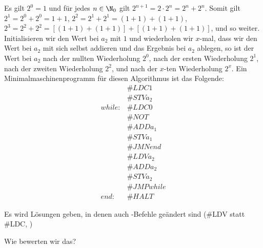 \documentclass[12pt]{article}
\newcommand{\lbl}[1]{\mathit{#1}}
\begin{document}
\begin{loesung}
  Es gilt $2^0 = 1$ und für jedes $n \in \N_0$ gilt $2^{n + 1} = 2 \cdot 2^n = 2^n + 2^n$. Somit gilt $2^1 = 2^0 + 2^0 = 1 + 1$, $2^2 = 2^1 + 2^1 = (1 + 1) + (1 + 1)$, $2^3 = 2^2 + 2^2 = [(1 + 1) + (1 + 1)] + [(1 + 1) + (1 + 1)]$, und so weiter. Initialisieren wir den Wert bei $a_2$ mit $1$ und wiederholen wir $x$-mal, dass wir den Wert bei $a_2$ mit sich selbst addieren und das Ergebnis bei $a_2$ ablegen, so ist der Wert bei $a_2$ nach der nullten Wiederholung $2^0$, nach der ersten Wiederholung $2^1$, nach der zweiten Wiederholung $2^2$, und nach der $x$-ten Wiederholung $2^x$. Ein Minimalmaschinenprogramm für diesen Algorithmus ist das Folgende:
  \begin{align*}
                       & \#{LDC } 1 \\
                       & \#{STV } a_2 \\
    \lbl{while\colon}  & \#{LDC } 0 \\
                       & \#{NOT} \\
                       & \#{ADD } a_1 \\
                       & \#{STV } a_1 \\
                       & \#{JMN } \lbl{end} \\
                       & \#{LDV } a_2 \\
                       & \#{ADD } a_2 \\
                       & \#{STV } a_2 \\
                       & \#{JMP } \lbl{while} \\
    \lbl{end\colon}    & \#{HALT}
  \end{align*}

  \begin{korrektur}
    Es wird Lösungen geben, in denen auch \mima-Befehle geändert sind
    (\#{LDV} statt \#{LDC}, \usw)

    Wie bewerten wir das?\\[2\baselineskip]

  \end{korrektur}
\end{loesung}

\end{document}
